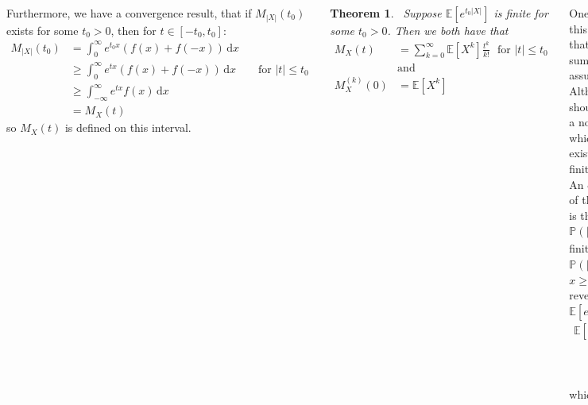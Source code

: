 \documentclass{tikzposter} %
\newtheorem{theorem}{Theorem}
\begin{document}
\begin{columns}
{  Furthermore, we have a convergence result, that if $M_{|X|}(t_{0})$ exists for some $t_{0} > 0$, then for $t \in [-t_{0}, t_{0}]$:
  \begin{align*}
    M_{|X|}(t_{0}) &= \int_{0}^{\infty} e^{t_{0}x}(f(x)+f(-x)) \, \mathrm{d}x \\
    &\ge \int_{0}^{\infty} e^{tx}(f(x)+f(-x)) \, \mathrm{d}x \quad \quad \text{for $|t| \le t_{0}$}\\
                   &\ge \int_{-\infty}^{\infty} e^{tx} f(x) \, \mathrm{d}x \\
    &= M_{X}(t)
  \end{align*}
  so $M_{X}(t)$ is defined on this interval. \\

  \begin{theorem}
  \ Suppose $\mathbb{E} [e^{t_{0}|X|}]$ is finite for some $t_{0} > 0$. Then we both have that
    \begin{align*}
      M_{X}(t) &= \sum_{k=0}^{\infty} \mathbb{E}[X^{k}] \frac{t^{k}}{k!} \ \ \ \text{for $|t| \le t_{0}$} \\
               &\text{and} \\
      M_{X}^{(k)}(0) &= \mathbb{E}[X^{k}]
    \end{align*}
  \end{theorem}
  \hphantom{}

  One needs a bit of work not included in this course (Fubini's theorem) to show that the expectation operator and infinite sums can commute in this case, but assuming that the result follows. \\

  Although not proven in this course, it should be hopefully clear that if there is a non-trivial interval containing $0$ on which the moment generating function exists, then all positive moments must be finite. \\

  An equivalent statement to the existence of the MGF on some neighbourhood of $0$ is that for some $t_{0} > 0$, $\mathbb{P}(|X| > x) = O(e^{-t_{0}x})$. If $M_{X}(t)$ is finite on $[-t_{0}, t_{0}]$, then $\mathbb{P}(|X| > x) \le e^{-t_{0}x}M_{X}(t_{0})$ for all $x \ge 0$ by Markov's inequality. In the reverse direction, we can use $\mathbb{E}[e^{tX}] \le \mathbb{E}[e^{t|X|}]$, from which we get
  \begin{align*}
  \mathbb{E}[e^{t|X|}]  &= \int_{0}^{\infty} \mathbb{P}(e^{t|X|} > x) \, \mathrm{d}x \\
                       &\le 1 + \int_{1}^{\infty} \mathbb{P}\left(|X| > \frac{\log x}{t}\right) \,\mathrm{d}x\\
                       &\le 1 + \int_{1}^{\infty} Cx^{-t_{0}/t} \,\mathrm{d}x
  \end{align*}
  which is a finite integral for $0 < t < t_{0}$. \\

}
\end{columns}
\end{document}
